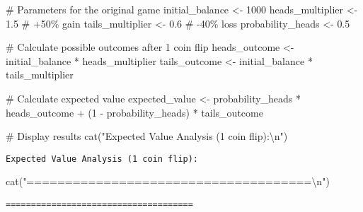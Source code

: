 \documentclass[
  letterpaper,
  DIV=11,
  numbers=noendperiod]{scrartcl}
\newenvironment{Shaded}{\begin{snugshade}}{\end{snugshade}}
\newcommand{\AttributeTok}[1]{\textcolor[rgb]{0.40,0.45,0.13}{#1}}
\newcommand{\CommentTok}[1]{\textcolor[rgb]{0.37,0.37,0.37}{#1}}
\newcommand{\DecValTok}[1]{\textcolor[rgb]{0.68,0.00,0.00}{#1}}
\newcommand{\FloatTok}[1]{\textcolor[rgb]{0.68,0.00,0.00}{#1}}
\newcommand{\FunctionTok}[1]{\textcolor[rgb]{0.28,0.35,0.67}{#1}}
\newcommand{\NormalTok}[1]{\textcolor[rgb]{0.00,0.23,0.31}{#1}}
\newcommand{\OtherTok}[1]{\textcolor[rgb]{0.00,0.23,0.31}{#1}}
\newcommand{\SpecialCharTok}[1]{\textcolor[rgb]{0.37,0.37,0.37}{#1}}
\newcommand{\StringTok}[1]{\textcolor[rgb]{0.13,0.47,0.30}{#1}}
\begin{document}
\begin{Shaded}
\begin{Highlighting}[]
\CommentTok{\# Parameters for the original game}
\NormalTok{initial\_balance }\OtherTok{\textless{}{-}} \DecValTok{1000}
\NormalTok{heads\_multiplier }\OtherTok{\textless{}{-}} \FloatTok{1.5}  \CommentTok{\# +50\% gain}
\NormalTok{tails\_multiplier }\OtherTok{\textless{}{-}} \FloatTok{0.6}  \CommentTok{\# {-}40\% loss}
\NormalTok{probability\_heads }\OtherTok{\textless{}{-}} \FloatTok{0.5}

\CommentTok{\# Calculate possible outcomes after 1 coin flip}
\NormalTok{heads\_outcome }\OtherTok{\textless{}{-}}\NormalTok{ initial\_balance }\SpecialCharTok{*}\NormalTok{ heads\_multiplier}
\NormalTok{tails\_outcome }\OtherTok{\textless{}{-}}\NormalTok{ initial\_balance }\SpecialCharTok{*}\NormalTok{ tails\_multiplier}

\CommentTok{\# Calculate expected value}
\NormalTok{expected\_value }\OtherTok{\textless{}{-}}\NormalTok{ probability\_heads }\SpecialCharTok{*}\NormalTok{ heads\_outcome }\SpecialCharTok{+}\NormalTok{ (}\DecValTok{1} \SpecialCharTok{{-}}\NormalTok{ probability\_heads) }\SpecialCharTok{*}\NormalTok{ tails\_outcome}

\CommentTok{\# Display results}
\FunctionTok{cat}\NormalTok{(}\StringTok{"Expected Value Analysis (1 coin flip):}\SpecialCharTok{\textbackslash{}n}\StringTok{"}\NormalTok{)}
\end{Highlighting}
\end{Shaded}

\begin{verbatim}
Expected Value Analysis (1 coin flip):
\end{verbatim}

\begin{Shaded}
\begin{Highlighting}[]
\FunctionTok{cat}\NormalTok{(}\StringTok{"=====================================}\SpecialCharTok{\textbackslash{}n}\StringTok{"}\NormalTok{)}
\end{Highlighting}
\end{Shaded}

\begin{verbatim}
=====================================
\end{verbatim}

\begin{Shaded}
\end{Shaded}
\end{document}
